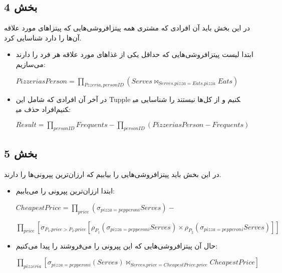 \subsection*{بخش 4}
در این بخش باید آن افرادی که مشتری همه پیتزافروشی‌هایی که پیتزاهای مورد علاقه آن‌ها را دارد شناسایی کرد.
\begin{itemize}	
	\item
	ابتدا لیست پیتزافروشی‌هایی که حداقل یکی از غذاهای مورد علاقه هر فرد را دارند می‌سازیم:
	
\setLTR
$PizzeriasPerson =\prod_{Pzzeria,personID} (Serves \bowtie_{Serves.pizza =Eats.pizza}Eats)$
\setRTL

	\item 
	در آخر آن افرادی که شامل این Tupple ها نیستند را شناسایی می‎کنیم و از کل افراد حذف می‎کنیم:
	
	\setLTR
	
	$Result = \prod_{personID}Frequents - \prod_{personID}(PizzeriasPerson - Frequents)$
	

	\setRTL
\end{itemize}


\subsection*{بخش 5}
در این بخش باید پیتزافروشی‌هایی را بیابیم که ارزان‌ترین پپرونی‌ها را دارند.
\begin{itemize}
	\item ابتدا ارزان‌ترین پپرونی را می‌یابیم:
	
	\setLTR
	$CheapestPrice = \prod_{price}(\sigma_{pizza=pepperoni}Serves) -$
	
	$ \prod_{price}[\sigma_{P_1.price>P_2.price}[\rho_{P_1}(\sigma_{pizza=pepperoni}Serves)\times\rho_{P_2}(\sigma_{pizza=pepperoni}Serves)]]$
	\setRTL
	
	\item حال آن پیتزافروشی‌هایی که این پپرونی را می‌فروشند را پیدا می‌کنیم:
	
	\setLTR
	
	$\prod_{pizzeria}[\sigma_{pizza=pepperoni}(Serves)\bowtie_{Serves.price = CheapestPrice.price}CheapestPrice]$
	\setRTL
\end{itemize}